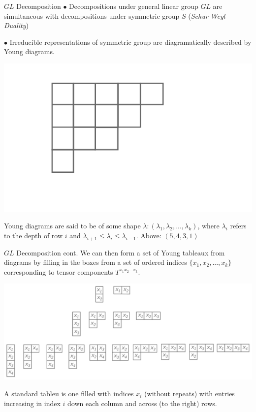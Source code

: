\documentclass[11pt]{beamer}
\begin{document}
\begin{frame}{$GL$ Decomposition}
$\bullet$ Decompositions under general linear group $GL$ are simultaneous with decompositions under symmetric group $S$ (\textit{Schur-Weyl Duality})

\medskip

$\bullet$ Irreducible representations of symmetric group are diagramatically described by Young diagrams.

\begin{center}
\includegraphics[scale=0.6]{youngdiagram-ex.pdf}
\end{center}
Young diagrams  are said to be of some shape $\lambda:(\lambda_1,\lambda_2,...,\lambda_k)$, where $\lambda_i$ refers to the depth of row $i$ and $\lambda_{i+1}\leq\lambda_i\leq\lambda_{i-1}$. Above: $(5,4,3,1)$
\end{frame}
\begin{frame}{$GL$ Decomposition cont.}
We can then form a set of Young tableaux from diagrams by filling in the boxes from a set of ordered indices $\lbrace x_1,x_2,...,x_k\rbrace$ corresponding to tensor components $T^{x_1x_2...x_k}$. 
\begin{center}
\includegraphics[scale=0.3]{youngtableaux-ex.pdf}
\end{center}
A standard tableu is one filled with indices $x_i$ (without repeats) with entries increasing in index $i$ down each column and across (to the right) rows.
\end{frame}
\end{document}
